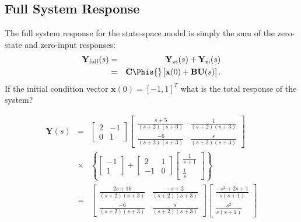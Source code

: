 \subsection*{Full System Response}
The full system response for the state-space model is simply the
sum of the zero-state and zero-input responses:
\begin{eqnarray*}\mathbf{Y}_{\mathrm{full}}(s) &=& \mathbf{Y}_{\mathrm{zs}}(s) +
\mathbf{Y}_{\mathrm{zi}}(s)\\ &=&
\mathbf{C}\Phis{}\left[\mathbf{x}(0)+\mathbf{B}\mathbf{U}(s)\right].\end{eqnarray*}
If the initial condition vector $\mathbf{x}(0)=[-1, 1]^T$ what is
the total response of the system?
\begin{slide}\label{slide:l4s16}
 \begin{eqnarray*} \mathbf{Y}(s)&=&
\left[\begin{array}{cc}
  2 & -1 \\
  0 & 1
\end{array}\right]
\left[\begin{array}{cc}
  \frac{s+5}{(s+2)(s+3)} & \frac{1}{(s+2)(s+3)} \\
  \frac{-6}{(s+2)(s+3)} & \frac{s}{(s+2)(s+3)}
\end{array}\right]\\
&\times& \left\{\left[\begin{array}{c}
  -1 \\
  1
\end{array}\right]+\left[\begin{array}{cc}
  2 & 1 \\
  -1 & 0
\end{array}\right]\left[\begin{array}{c}
  \frac{1}{s+1} \\
  \frac{1}{s}
\end{array}\right]\right\}\\
&=& \left[\begin{array}{cc}
  \frac{2s+16}{(s+2)(s+3)} & \frac{-s+2}{(s+2)(s+3)} \\
  \frac{-6}{(s+2)(s+3)} & \frac{s}{(s+2)(s+3)}
\end{array}\right]\left[\begin{array}{c}
  \frac{-s^2+2s+1}{s(s+1)} \\
  \frac{s^2}{s(s+1)}
\end{array}\right]
\end{eqnarray*}
\end{slide}
